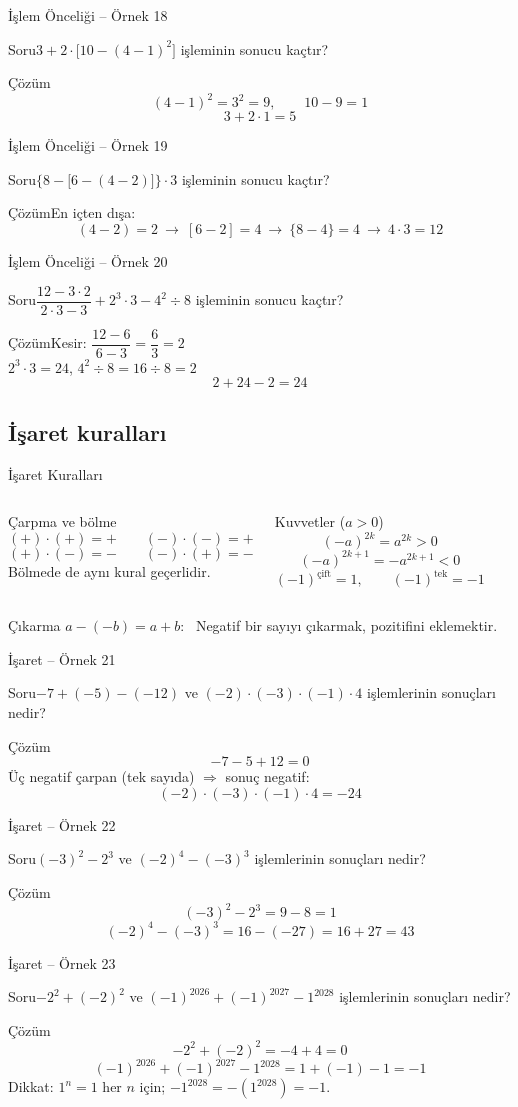 \documentclass[aspectratio=169,11pt,handout]{beamer}
\newcommand{\soru}[3]{%
\begin{frame}{#1}
  \begin{block}{Soru}\large #2\end{block}
  \pause
  \begin{exampleblock}{Çözüm}\large #3\end{exampleblock}
\end{frame}}
\begin{document}
\soru{İşlem Önceliği -- Örnek 18}
{\(3+2\cdot\big[10-(4-1)^2\big]\) işleminin sonucu kaçtır?}
{\[(4-1)^2=3^2=9,\qquad 10-9=1\]
\[3+2\cdot 1=5\]}

\soru{İşlem Önceliği -- Örnek 19}
{\(\big\{8-\big[6-(4-2)\big]\big\}\cdot 3\) işleminin sonucu kaçtır?}
{En içten dışa:
\[(4-2)=2\ \rightarrow\ [6-2]=4\ \rightarrow\ \{8-4\}=4\ \rightarrow\ 4\cdot 3=12\]}

\soru{İşlem Önceliği -- Örnek 20}
{\(\dfrac{12-3\cdot 2}{2\cdot 3-3}+2^3\cdot 3-4^2\div 8\) işleminin sonucu kaçtır?}
{Kesir: \(\dfrac{12-6}{6-3}=\dfrac{6}{3}=2\)\\[3pt]
\(2^3\cdot 3=24\), \quad \(4^2\div 8=16\div 8=2\)
\[2+24-2=24\]}

\subsection{İşaret kuralları}
\begin{frame}{İşaret Kuralları}
\begin{columns}[t]
\begin{block}{Çarpma ve bölme}
\[(+)\cdot(+)=+\qquad (-)\cdot(-)=+\]
\[(+)\cdot(-)=-\qquad (-)\cdot(+)=-\]
Bölmede de aynı kural geçerlidir.
\end{block}
\begin{block}{Kuvvetler (\(a>0\))}
\[(-a)^{2k}=a^{2k}>0\]
\[(-a)^{2k+1}=-a^{2k+1}<0\]
\[(-1)^{\text{çift}}=1,\qquad (-1)^{\text{tek}}=-1\]
\end{block}
\end{columns}
\begin{alertblock}{Çıkarma}
\(a-(-b)=a+b\): \ Negatif bir sayıyı çıkarmak, pozitifini eklemektir.
\end{alertblock}
\end{frame}

\soru{İşaret -- Örnek 21}
{\(-7+(-5)-(-12)\) ve \((-2)\cdot(-3)\cdot(-1)\cdot 4\) işlemlerinin sonuçları nedir?}
{\[-7-5+12=0\]
Üç negatif çarpan (tek sayıda) \(\Rightarrow\) sonuç negatif:
\[(-2)\cdot(-3)\cdot(-1)\cdot 4=-24\]}

\soru{İşaret -- Örnek 22}
{\((-3)^2-2^3\) ve \((-2)^4-(-3)^3\) işlemlerinin sonuçları nedir?}
{\[(-3)^2-2^3=9-8=1\]
\[(-2)^4-(-3)^3=16-(-27)=16+27=43\]}

\soru{İşaret -- Örnek 23}
{\(-2^2+(-2)^2\) ve \((-1)^{2026}+(-1)^{2027}-1^{2028}\) işlemlerinin sonuçları nedir?}
{\[-2^2+(-2)^2=-4+4=0\]
\[(-1)^{2026}+(-1)^{2027}-1^{2028}=1+(-1)-1=-1\]
Dikkat: \(1^{n}=1\) her \(n\) için; \(-1^{2028}=-(1^{2028})=-1\).}
\end{document}
